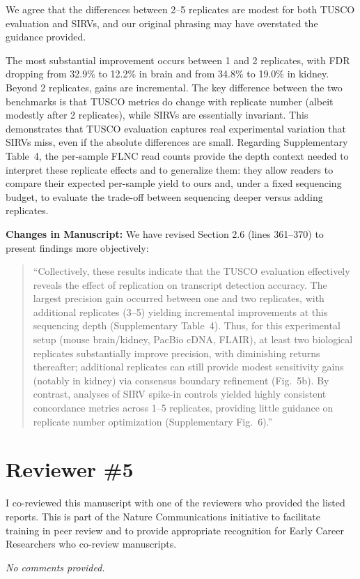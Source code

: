\documentclass[11pt]{article}
\newcommand{\tuscoEvaluation}{TUSCO evaluation}
\begin{document}
\begin{responseboxnew}
We agree that the differences between 2--5 replicates are modest for both TUSCO evaluation and SIRVs, and our original phrasing may have overstated the guidance provided.

The most substantial improvement occurs between 1 and 2 replicates, with FDR dropping from 32.9\% to 12.2\% in brain and from 34.8\% to 19.0\% in kidney. Beyond 2 replicates, gains are incremental. The key difference between the two benchmarks is that TUSCO metrics do change with replicate number (albeit modestly after 2 replicates), while SIRVs are essentially invariant. This demonstrates that TUSCO evaluation captures real experimental variation that SIRVs miss, even if the absolute differences are small. Regarding Supplementary Table~4, the per-sample FLNC read counts provide the depth context needed to interpret these replicate effects and to generalize them: they allow readers to compare their expected per-sample yield to ours and, under a fixed sequencing budget, to evaluate the trade-off between sequencing deeper versus adding replicates.

\vspace{0.3cm}
\textbf{Changes in Manuscript:} We have revised Section 2.6 (lines 361--370) to present findings more objectively:

\begin{quote}
``Collectively, these results indicate that the \tuscoEvaluation{} effectively reveals the effect of replication on transcript detection accuracy. The largest precision gain occurred between one and two replicates, with additional replicates (3--5) yielding incremental improvements at this sequencing depth (Supplementary Table~4). Thus, for this experimental setup (mouse brain/kidney, PacBio cDNA, FLAIR), at least two biological replicates substantially improve precision, with diminishing returns thereafter; additional replicates can still provide modest sensitivity gains (notably in kidney) via consensus boundary refinement (Fig.~5b). By contrast, analyses of SIRV spike-in controls yielded highly consistent concordance metrics across 1--5 replicates, providing little guidance on replicate number optimization (Supplementary Fig.~6).''
\end{quote}
\end{responseboxnew}

\newpage

\section{Reviewer \#5}

\begin{positiveremarks}
I co-reviewed this manuscript with one of the reviewers who provided the listed reports. This is part of the Nature Communications initiative to facilitate training in peer review and to provide appropriate recognition for Early Career Researchers who co-review manuscripts.
\end{positiveremarks}

\textit{No comments provided.}
\end{document}
